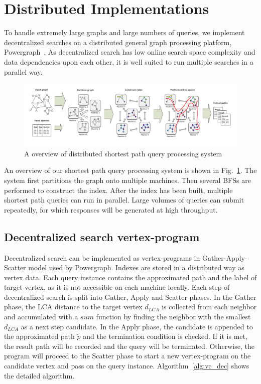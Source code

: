 \section{Distributed Implementations}
\label{implementation}

To handle extremely large graphs and large numbers of queries, we implement decentralized searches on a distributed general graph processing platform, Powergraph~\cite{180251}. As decentralized search has low online search space complexity and data dependencies upon each other, it is well suited to run multiple searches in a parallel way. 

\begin{figure}[ht]
    \centering
    \includegraphics[width=\linewidth]{./figures/new_illustrate/system.pdf}
    \caption{A overview of distributed shortest path query processing system}
    \label{fig:system}
\end{figure}

An overview of our shortest path query processing system is shown in Fig.~\ref{fig:system}. The system first partitions the graph onto multiple machines. Then several BFSs are performed to construct the index. After the index has been built, multiple shortest path queries can run in parallel. Large volumes of queries can submit repeatedly, for which responses will be generated at high throughput.

\subsection{Decentralized search vertex-program}

Decentralized search can be implemented as vertex-programs in Gather-Apply-Scatter model used by Powergraph. Indexes are stored in a distributed way as vertex data. Each query instance contains the approximated path and the label of target vertex, as it is not accessible on each machine locally. Each step of decentralized search is split into Gather, Apply and Scatter phases. In the Gather phase, the LCA distance to the target vertex $d_{LCA}$ is collected from each neighbor and accumulated with a $sum$ function by finding the neighbor with the smallest $d_{LCA}$ as a next step candidate. In the Apply phase, the candidate is appended to the approximated path $\tilde{p}$ and the termination condition is checked. If it is met, the result path will be recorded and the query will be terminated. Otherwise, the program will proceed to the Scatter phase to start a new vertex-program on the candidate vertex and pass on the query instance. Algorithm~\ref{alg:vc_dec} shows the detailed algorithm.

